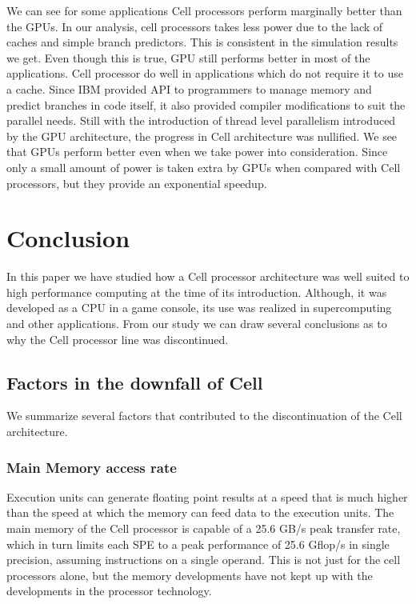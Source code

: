 \documentclass{sig-alternate-05-2015}
\begin{document}
We can see for some applications Cell processors perform marginally better than the GPUs. In our analysis, cell processors takes less power due to the lack of caches and simple branch predictors. This is consistent in the simulation results we get. Even though this is true, GPU still performs better in most of the applications. Cell processor do well in applications which do not require it to use a cache. Since IBM provided API to programmers to manage memory and predict branches in code itself, it also provided compiler modifications to suit the parallel needs. Still with the introduction of thread level parallelism introduced by the GPU architecture, the progress in Cell architecture was nullified. We see that GPUs perform better even when we take power into consideration. Since only a small amount of power is taken extra by GPUs when compared with Cell processors, but they provide an exponential speedup. 

\section{Conclusion}

In this paper we have studied how a Cell processor architecture was well suited to high performance computing at the time of its introduction. Although, it was developed as a CPU in a game console, its use was realized in supercomputing and other applications. From our study we can draw several conclusions as to why the Cell processor line was discontinued.

\subsection{Factors in the downfall of Cell}

We summarize several factors that contributed to the discontinuation of the Cell architecture.

\subsubsection{Main Memory access rate}
Execution units can generate floating point results at a speed that is much higher than the speed at which the memory can feed data to the execution units. The main memory of the Cell processor is capable of a 25.6 GB/s peak transfer rate, which in turn limits each SPE to a peak performance of 25.6 Gflop/s in single precision, assuming instructions on a single operand. This is not just for the cell processors alone, but the memory developments have not kept up with the developments in the processor technology. 
 
\end{document}
